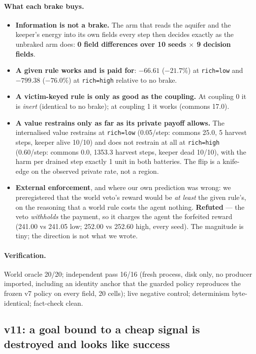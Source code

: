 \documentclass[11pt]{article}
\newcommand{\code}[1]{\texttt{\small #1}}
\begin{document}
\paragraph{What each brake buys.}
\begin{itemize}[leftmargin=1.4em,itemsep=2pt]
\item \textbf{Information is not a brake.} The arm that reads the aquifer and the
keeper's energy into its own fields every step then decides exactly as the unbraked
arm does: \textbf{0 field differences over 10 seeds $\times$ 9 decision fields}.
\item \textbf{A given rule works and is paid for}: $-66.61$ ($-21.7\%$) at
\code{rich=low} and $-799.38$ ($-76.0\%$) at \code{rich=high} relative to no brake.
\item \textbf{A victim-keyed rule is only as good as the coupling.} At coupling 0 it
is \emph{inert} (identical to no brake); at coupling 1 it works (commons 17.0).
\item \textbf{A value restrains only as far as its private payoff allows.} The
internalised value restrains at \code{rich=low} (0.05/step: commons 25.0, 5 harvest
steps, keeper alive 10/10) and does not restrain at all at \code{rich=high}
(0.60/step: commons 0.0, 1353.3 harvest steps, keeper dead 10/10), with the harm per
drained step exactly 1 unit in both batteries. The flip is a knife-edge on the
observed private rate, not a region.
\item \textbf{External enforcement}, and where our own prediction was wrong: we
preregistered that the world veto's reward would be \emph{at least} the given rule's,
on the reasoning that a world rule costs the agent nothing. \textbf{Refuted} --- the
veto \emph{withholds} the payment, so it charges the agent the forfeited reward
(241.00 vs 241.05 low; 252.00 vs 252.60 high, every seed). The magnitude is tiny; the
direction is not what we wrote.
\end{itemize}

\paragraph{Verification.} World oracle 20/20; independent pass 16/16 (fresh process,
disk only, no producer imported, including an identity anchor that the guarded policy
reproduces the frozen v7 policy on every field, 20 cells); live negative control;
determinism byte-identical; fact-check clean.

\subsection{v11: a goal bound to a cheap signal is destroyed and looks like success}
\label{sec:v11}
\end{document}

